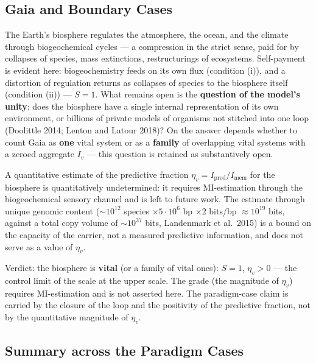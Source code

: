 \documentclass[pdflatex,sn-mathphys-ay]{sn-jnl}
\begin{document}
\subsection{Gaia and Boundary Cases}\label{gaia-and-boundary-cases}

The Earth's biosphere regulates the atmosphere, the ocean, and the climate through biogeochemical cycles --- a compression in the strict sense, paid for by collapses of species, mass extinctions, restructurings of ecosystems. Self-payment is evident here: biogeochemistry feeds on its own flux (condition (i)), and a distortion of regulation returns as collapses of species to the biosphere itself (condition (ii)) --- \(S = 1\). What remains open is the \textbf{question of the model's unity}: does the biosphere have a single internal representation of its own environment, or billions of private models of organisms not stitched into one loop (Doolittle 2014; Lenton and Latour 2018)? On the answer depends whether to count Gaia as \textbf{one} vital system or as a \textbf{family} of overlapping vital systems with a zeroed aggregate \(I_v\) --- this question is retained as substantively open.

A quantitative estimate of the predictive fraction \(\eta_v = I_{\text{pred}}/I_{\text{mem}}\) for the biosphere is quantitatively undetermined: it requires MI-estimation through the biogeochemical sensory channel and is left to future work. The estimate through unique genomic content (\(\sim 10^{12}\) species \(\times 5 \cdot 10^6\) bp \(\times 2\) bits/bp \(\approx 10^{19}\) bits, against a total copy volume of \(\sim 10^{37}\) bits, Landenmark et al.~2015) is a bound on the capacity of the carrier, not a measured predictive information, and does not serve as a value of \(\eta_v\).

Verdict: the biosphere is \textbf{vital} (or a family of vital ones): \(S = 1\), \(\eta_v > 0\) --- the control limit of the scale at the upper scale. The grade (the magnitude of \(\eta_v\)) requires MI-estimation and is not asserted here. The paradigm-case claim is carried by the closure of the loop and the positivity of the predictive fraction, not by the quantitative magnitude of \(\eta_v\).

\subsection{Summary across the Paradigm Cases}\label{summary-across-the-paradigm-cases}
\end{document}
